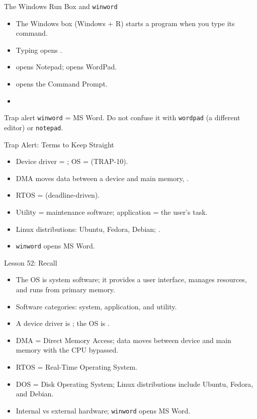 \documentclass[aspectratio=169]{beamer}
\begin{document}
\begin{frame}{The Windows Run Box and \texttt{winword}}
  \begin{itemize}
    \item The Windows  box (Windows + R) starts a program when you
      type its command.
    \item Typing  opens .
    \item {} opens Notepad;  opens
      WordPad.
    \item {} opens the Command Prompt.
    \item {}
  \end{itemize}
  \begin{alertblock}{Trap alert}
    \texttt{winword} = MS Word. Do not confuse it with \texttt{wordpad} (a
    different editor) or \texttt{notepad}.
  \end{alertblock}
\end{frame}

\begin{frame}{Trap Alert: Terms to Keep Straight}
  \begin{itemize}
    \item Device driver = ; OS = 
      (TRAP-10).
    \item DMA moves data between a device and main memory, .
    \item RTOS =  (deadline-driven).
    \item Utility = maintenance software; application = the user's task.
    \item Linux distributions: Ubuntu, Fedora, Debian; .
    \item \texttt{winword} opens MS Word.
  \end{itemize}
\end{frame}

\begin{frame}{Lesson 52: Recall}
  \begin{itemize}
    \item The OS is system software; it provides a user interface, manages
      resources, and runs from primary memory.
    \item Software categories: system, application, and utility.
    \item A device driver is ; the OS is .
    \item DMA = Direct Memory Access; data moves between device and main
      memory with the CPU bypassed.
    \item RTOS = Real-Time Operating System.
    \item DOS = Disk Operating System; Linux distributions include Ubuntu,
      Fedora, and Debian.
    \item Internal vs external hardware; \texttt{winword} opens MS Word.
  \end{itemize}
\end{frame}
\end{document}
